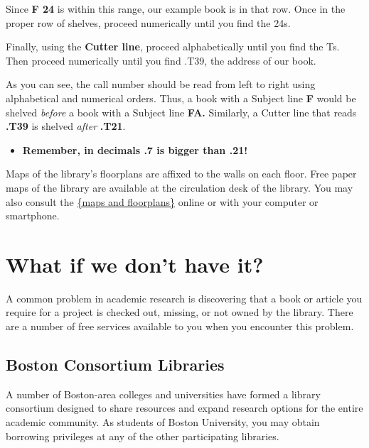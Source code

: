 {\begin{center}
\hspace{.4in}{\huge F 7.4\textendash F 45.2}
\end{center}

Since \textbf{F 24} is within this range, our example book is in that row. Once 
in the proper row of shelves, proceed numerically until you find the 24s. 

Finally, using the \textbf{Cutter line}, proceed alphabetically until you find 
the Ts. Then proceed numerically until you find .T39, the address of our book. 

As you can see, the call number should be read from left to right using 
alphabetical and numerical orders. Thus, a book with a Subject line \textbf{F 
}would be shelved \emph{before} a book with a Subject line \textbf{FA.} 
Similarly, a Cutter line that reads \textbf{.T39} is shelved \emph{after} 
\textbf{.T21}. 

\begin{itemize}
\item \textbf{Remember, in decimals .7 is bigger than .21!}
\end{itemize}

Maps of the library's floorplans are affixed to the walls on each floor. Free 
paper maps of the library are available at the circulation desk of the library. 
You may also consult the 
\href{http://www.bu.edu/library/mugar-memorial/about/floorplans/#f=floor-1}{\{maps and floorplans\}} 
online or with your computer or smartphone. 

\section{What if we don't have it?}
    
A common problem in academic research is discovering that a book or article you 
require for a project is checked out, missing, or not owned by the library. 
There are a number of free services available to you when you encounter this 
problem.

\subsection{Boston Consortium Libraries}

A number of Boston-area colleges and universities have formed a library 
consortium designed to share resources and expand research options for the 
entire academic community. As students of Boston University, you may obtain 
borrowing privileges at any of the other participating libraries. 

}
